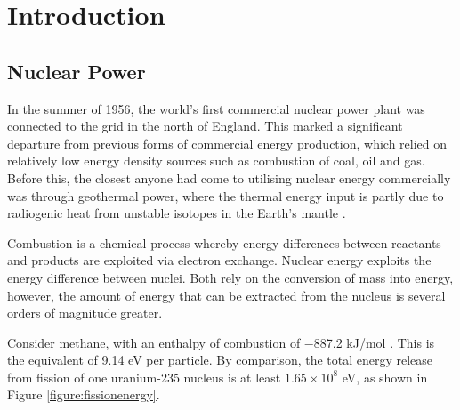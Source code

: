 \chapter{Introduction} \label{introduction}

\section{Nuclear Power} %

In the summer of 1956, the world's first commercial nuclear power plant was connected to the grid in the north of England. This marked a significant departure from previous forms of commercial energy production, which relied on relatively low energy density sources such as combustion of coal, oil and gas. Before this, the closest anyone had come to utilising nuclear energy commercially was through geothermal power, where the thermal energy input is partly due to radiogenic heat from unstable isotopes in the Earth's mantle \cite{gando2011partial}. 

Combustion is a chemical process whereby energy differences between reactants and products are exploited via electron exchange. Nuclear energy exploits the energy difference between nuclei. Both rely on the conversion of mass into energy, however, the amount of energy that can be extracted from the nucleus is several orders of magnitude greater.

Consider methane, with an enthalpy of combustion of −887.2 kJ/mol \cite{thornton1917xv}. This is the equivalent of 9.14 eV per particle. By comparison, the total energy release from fission of one uranium-235 nucleus is at least $1.65 \times 10^{8}$ eV, as shown in Figure \ref{figure:fissionenergy}.

